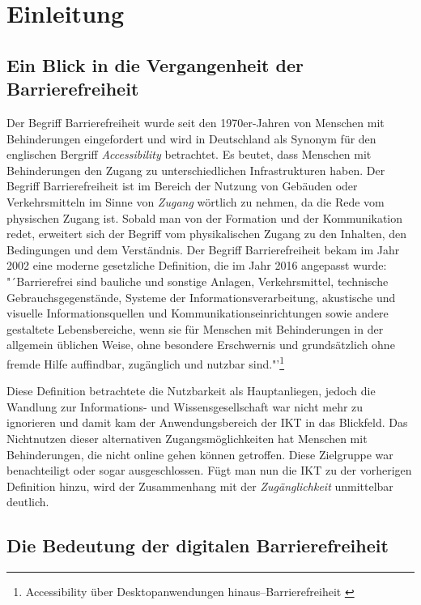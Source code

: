 \section{Einleitung}

\subsection{Ein Blick in die Vergangenheit der Barrierefreiheit}
Der Begriff Barrierefreiheit wurde seit den 1970er-Jahren von Menschen mit Behinderungen eingefordert und wird in Deutschland als Synonym für den englischen Bergriff \textit{Accessibility} betrachtet. Es beutet, dass Menschen mit Behinderungen den Zugang zu unterschiedlichen Infrastrukturen haben. Der Begriff Barrierefreiheit ist im Bereich der Nutzung von Gebäuden oder Verkehrsmitteln im Sinne von \textit{Zugang} wörtlich zu nehmen, da die Rede vom physischen Zugang ist. Sobald man von der Formation und der Kommunikation redet, erweitert sich der Begriff vom physikalischen Zugang zu den Inhalten, den Bedingungen und dem Verständnis. Der Begriff Barrierefreiheit bekam im Jahr 2002 eine moderne gesetzliche Definition, die im Jahr 2016 angepasst wurde: "´Barrierefrei sind bauliche und sonstige Anlagen, Verkehrsmittel, technische Gebrauchsgegenstände, Systeme der Informationsverarbeitung, akustische und visuelle Informationsquellen und Kommunikationseinrichtungen sowie andere gestaltete Lebensbereiche, wenn sie für Menschen mit Behinderungen in der allgemein üblichen Weise, ohne besondere Erschwernis und grundsätzlich ohne fremde Hilfe auffindbar, zugänglich und nutzbar sind."'\footnote{Accessibility über Desktopanwendungen hinaus–Barrierefreiheit \cite{buhler2017accessibility}}

Diese Definition betrachtete die Nutzbarkeit als Hauptanliegen, jedoch die Wandlung zur Informations- und Wissensgesellschaft war nicht mehr zu ignorieren und damit kam der Anwendungsbereich der \ac{IKT} in das Blickfeld. Das Nichtnutzen dieser alternativen Zugangsmöglichkeiten hat Menschen mit Behinderungen, die nicht online gehen können getroffen. Diese Zielgruppe war benachteiligt oder sogar ausgeschlossen. Fügt man nun die \ac{IKT} zu der vorherigen Definition hinzu, wird der Zusammenhang mit der \textit{Zugänglichkeit} unmittelbar deutlich.

\subsection{Die Bedeutung der digitalen Barrierefreiheit}

